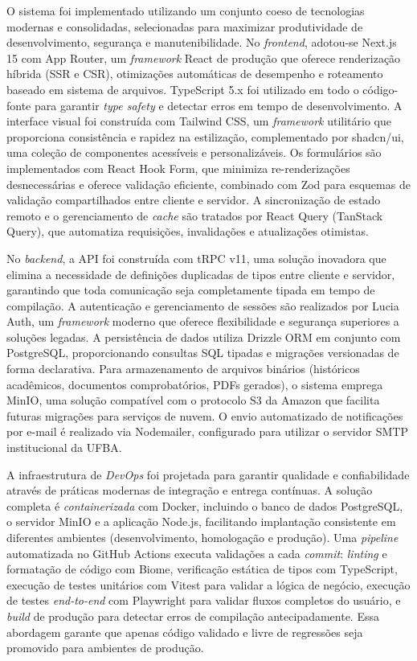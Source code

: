 \documentclass[portuguese]{sbc2025}%
\begin{document}
O sistema foi implementado utilizando um conjunto coeso de tecnologias modernas e consolidadas, selecionadas para maximizar produtividade de desenvolvimento, segurança e manutenibilidade. No \textit{frontend}, adotou-se Next.js 15 com App Router, um \textit{framework} React de produção que oferece renderização híbrida (SSR e CSR), otimizações automáticas de desempenho e roteamento baseado em sistema de arquivos. TypeScript 5.x foi utilizado em todo o código-fonte para garantir \textit{type safety} e detectar erros em tempo de desenvolvimento. A interface visual foi construída com Tailwind CSS, um \textit{framework} utilitário que proporciona consistência e rapidez na estilização, complementado por shadcn/ui, uma coleção de componentes acessíveis e personalizáveis. Os formulários são implementados com React Hook Form, que minimiza re-renderizações desnecessárias e oferece validação eficiente, combinado com Zod para esquemas de validação compartilhados entre cliente e servidor. A sincronização de estado remoto e o gerenciamento de \textit{cache} são tratados por React Query (TanStack Query), que automatiza requisições, invalidações e atualizações otimistas.

No \textit{backend}, a API foi construída com tRPC v11, uma solução inovadora que elimina a necessidade de definições duplicadas de tipos entre cliente e servidor, garantindo que toda comunicação seja completamente tipada em tempo de compilação. A autenticação e gerenciamento de sessões são realizados por Lucia Auth, um \textit{framework} moderno que oferece flexibilidade e segurança superiores a soluções legadas. A persistência de dados utiliza Drizzle ORM em conjunto com PostgreSQL, proporcionando consultas SQL tipadas e migrações versionadas de forma declarativa. Para armazenamento de arquivos binários (históricos acadêmicos, documentos comprobatórios, PDFs gerados), o sistema emprega MinIO, uma solução compatível com o protocolo S3 da Amazon que facilita futuras migrações para serviços de nuvem. O envio automatizado de notificações por e-mail é realizado via Nodemailer, configurado para utilizar o servidor SMTP institucional da UFBA.

A infraestrutura de \textit{DevOps} foi projetada para garantir qualidade e confiabilidade através de práticas modernas de integração e entrega contínuas. A solução completa é \textit{containerizada} com Docker, incluindo o banco de dados PostgreSQL, o servidor MinIO e a aplicação Node.js, facilitando implantação consistente em diferentes ambientes (desenvolvimento, homologação e produção). Uma \textit{pipeline} automatizada no GitHub Actions executa validações a cada \textit{commit}: \textit{linting} e formatação de código com Biome, verificação estática de tipos com TypeScript, execução de testes unitários com Vitest para validar a lógica de negócio, execução de testes \textit{end-to-end} com Playwright para validar fluxos completos do usuário, e \textit{build} de produção para detectar erros de compilação antecipadamente. Essa abordagem garante que apenas código validado e livre de regressões seja promovido para ambientes de produção.
\end{document}
